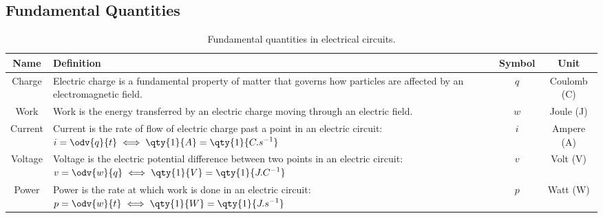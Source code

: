 \documentclass{article}
\begin{document}
\subsection{Fundamental Quantities}
\begingroup
\renewcommand{\arraystretch}{1.5}
\begin{table}[H]
    \centering
    \begin{tabular}
        {c >{\centering}p{} c c}
        \toprule
        \textbf{Name} & \textbf{Definition}                                                                                                                                        & \textbf{Symbol}           & \textbf{Unit} \\
        \midrule
        Charge        & Electric charge is a fundamental property of matter that governs how particles are affected by an electromagnetic field.
                      & \(q\)                                                                                                                                                      & Coulomb (\unit{\coulomb})                 \\
        \midrule
        Work          & Work is the energy transferred by an electric charge moving through an electric field.
                      & \(w\)                                                                                                                                                      & Joule (\unit{\joule})                     \\
        \midrule
        Current       & Current is the rate of flow of electric charge past a point in an electric circuit: \(\displaystyle i = \odv{q}{t}\iff\qty{1}{A} = \qty{1}{C.s^{-1}}\)
                      & \(i\)                                                                                                                                                      & Ampere (\unit{\ampere})                   \\
        \midrule
        Voltage       & Voltage is the electric potential difference between two points in an electric circuit: \(\displaystyle v = \odv{w}{q}\iff\qty{1}{V} = \qty{1}{J.C^{-1}}\)
                      & \(v\)                                                                                                                                                      & Volt (\unit{\volt})                       \\
        \midrule
        Power         & Power is the rate at which work is done in an electric circuit: \(\displaystyle p = \odv{w}{t}\iff\qty{1}{W} = \qty{1}{J.s^{-1}}\)
                      & \(p\)                                                                                                                                                      & Watt (\unit{\watt})                       \\
        \bottomrule
    \end{tabular}
    \caption{Fundamental quantities in electrical circuits.}
\end{table}
\end{document}
